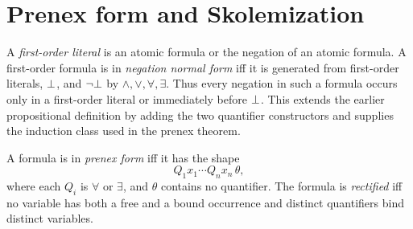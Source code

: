 \section{Prenex form and Skolemization}
\label{sec:fol-cardinality-normalforms-03}

\begin{definition}
A \emph{first-order literal} is an atomic formula or the negation of an
atomic formula.  A first-order formula is in \emph{negation normal form} iff
it is generated from first-order literals, \(\bot\), and
\(\neg\bot\) by \(\land,\lor,\forall,\exists\).  Thus every negation in
such a formula occurs only in a first-order literal or immediately before
\(\bot\).  This extends the earlier propositional definition by adding
the two quantifier constructors and supplies the induction class used in the
prenex theorem.
\end{definition}

\begin{definition}
A formula is in \emph{prenex form} iff it has the shape
\[
 Q_1x_1\cdots Q_nx_n\,\theta,
\]
where each \(Q_i\) is \(\forall\) or \(\exists\), and \(\theta\) contains no
quantifier.  The formula is \emph{rectified} iff no variable has both a free
and a bound occurrence and distinct quantifiers bind distinct variables.
\end{definition}

